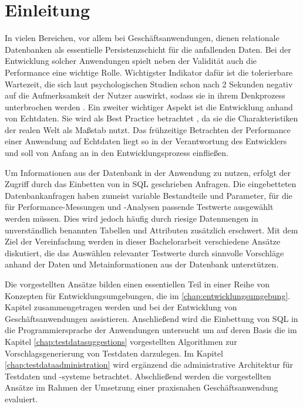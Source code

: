 \section{Einleitung}\label{chap:introduction}

%
%

In vielen Bereichen, vor allem bei Geschäftsanwendungen, dienen relationale Datenbanken als essentielle Persistenzschicht für die anfallenden Daten.
Bei der Entwicklung solcher Anwendungen spielt neben der Validität auch die Performance eine wichtige Rolle.
Wichtigster Indikator dafür ist die tolerierbare Wartezeit, die sich laut psychologischen Studien schon nach 2 Sekunden negativ auf die Aufmerksamkeit der Nutzer auswirkt, sodass sie in ihrem Denkprozess unterbrochen werden \cite{Nah04}.
Ein zweiter wichtiger Aspekt ist die Entwicklung anhand von Echtdaten.
Sie wird als Best Practice betrachtet \cite[S. 212]{Plattner:2013:CID:2490529}, da sie die Charakteristiken der realen Welt als Maßstab nutzt.
Das frühzeitige Betrachten der Performance einer Anwendung auf Echtdaten liegt so in der Verantwortung des Entwicklers und soll von Anfang an in den Entwicklungsprozess einfließen.

Um Informationen aus der Datenbank in der Anwendung zu nutzen, erfolgt der Zugriff durch das Einbetten von in SQL geschrieben Anfragen.
Die eingebetteten Datenbankanfragen haben zumeist variable Bestandteile und Parameter, für die für Performance-Messungen und -Analysen passende Testwerte ausgewählt werden müssen.
Dies wird jedoch häufig durch riesige Datenmengen in unverständlich benannten Tabellen und Attributen zusätzlich erschwert.
Mit dem Ziel der Vereinfachung werden in dieser Bachelorarbeit verschiedene Ansätze diskutiert, die das Auswählen relevanter Testwerte durch sinnvolle Vorschläge anhand der Daten und Metainformationen aus der Datenbank unterstützen.

Die vorgestellten Ansätze bilden einen essentiellen Teil in einer Reihe von Konzepten für Entwicklungsumgebungen, die im \ref{chap:entwicklungsumgebung}. Kapitel zusammengetragen werden und bei der Entwicklung von Geschäftsanwendungen assistieren.
Anschließend wird die Einbettung von SQL in die Programmiersprache der Anwendungen untersucht um auf deren Basis die im Kapitel \ref{chap:testdatasuggestions} vorgestellten Algorithmen zur Vorschlagsgenerierung von Testdaten darzulegen.
Im Kapitel \ref{chap:testdataadministration} wird ergänzend die administrative Architektur für Testdaten und -systeme betrachtet.
Abschließend werden die vorgestellten Ansätze im Rahmen der Umsetzung einer praxisnahen Geschäftsanwendung evaluiert.